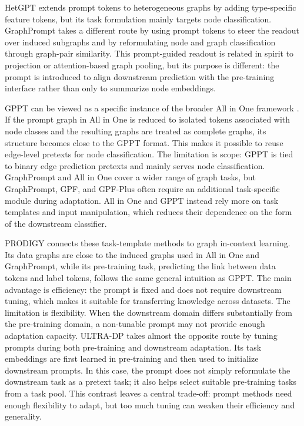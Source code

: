 HetGPT \cite{ma2023hetgpt} extends prompt tokens to heterogeneous graphs by adding type-specific feature tokens, but its task formulation mainly targets node classification. GraphPrompt \cite{liu2023graphprompt} takes a different route by using prompt tokens to steer the readout over induced subgraphs and by reformulating node and graph classification through graph-pair similarity. This prompt-guided readout is related in spirit to projection or attention-based graph pooling, but its purpose is different: the prompt is introduced to align downstream prediction with the pre-training interface rather than only to summarize node embeddings.

GPPT \cite{sun2022gppt} can be viewed as a specific instance of the broader All in One framework \cite{sun2023all}. If the prompt graph in All in One is reduced to isolated tokens associated with node classes and the resulting graphs are treated as complete graphs, its structure becomes close to the GPPT format. This makes it possible to reuse edge-level pretexts for node classification. The limitation is scope: GPPT is tied to binary edge prediction pretexts and mainly serves node classification. GraphPrompt and All in One cover a wider range of graph tasks, but GraphPrompt, GPF, and GPF-Plus often require an additional task-specific module during adaptation. All in One and GPPT instead rely more on task templates and input manipulation, which reduces their dependence on the form of the downstream classifier.


PRODIGY \cite{huang2023prodigy} connects these task-template methods to graph in-context learning. Its data graphs are close to the induced graphs used in All in One and GraphPrompt, while its pre-training task, predicting the link between data tokens and label tokens, follows the same general intuition as GPPT. The main advantage is efficiency: the prompt is fixed and does not require downstream tuning, which makes it suitable for transferring knowledge across datasets. The limitation is flexibility. When the downstream domain differs substantially from the pre-training domain, a non-tunable prompt may not provide enough adaptation capacity. ULTRA-DP \cite{chen2023ultradp} takes almost the opposite route by tuning prompts during both pre-training and downstream adaptation. Its task embeddings are first learned in pre-training and then used to initialize downstream prompts. In this case, the prompt does not simply reformulate the downstream task as a pretext task; it also helps select suitable pre-training tasks from a task pool. This contrast leaves a central trade-off: prompt methods need enough flexibility to adapt, but too much tuning can weaken their efficiency and generality.


